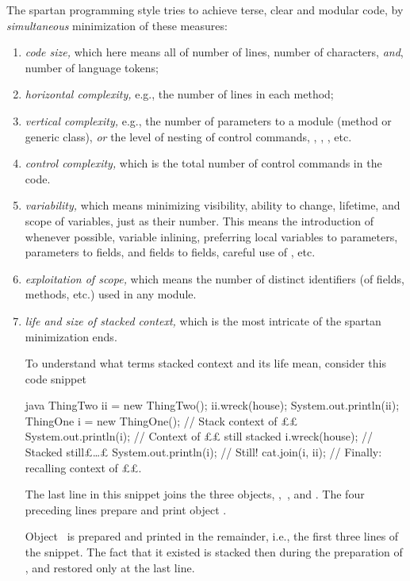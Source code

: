 The spartan programming style tries to achieve terse, clear and modular code,
by \textit{simultaneous} minimization of these measures:
\begin{enumerate}
  \item \textit{code size,} which here means all of number of lines, number of
        characters, \emph{and}, number of language tokens;
  \item \textit{horizontal complexity,} e.g., the number of lines in each
        method;
  \item \textit{vertical complexity,} e.g., the number of parameters to a
        module (method or generic class), \emph{or} the level of nesting of
        control commands, , , , etc.
  \item \textit{control complexity,} which is the total number of control
        commands in the code.
  \item \textit{variability,} which means minimizing visibility, ability to
        change, lifetime, and scope of variables, just as their number.
        This means the introduction of  whenever possible,
        variable inlining, preferring local variables to parameters, parameters
        to fields, and fields to  fields, careful use of
        , etc.
  \item \textit{exploitation of scope,} which means the number of distinct
        identifiers (of fields, methods, etc.) used in any module.
  \item \textit{life and size of stacked context,} which is the most intricate of the
        spartan minimization ends. 
        
        To understand what terms stacked context and its life mean, consider
        this code snippet

        \begin{code}[minipage,width=54ex]{java}
ThingTwo ii = new ThingTwo();
ii.wreck(house);
System.out.println(ii);
ThingOne i = new ThingOne(); // Stack context of ££
System.out.println(i);       // Context of ££ still stacked
i.wreck(house);              // Stacked still£…£
System.out.println(i);       // Still!
cat.join(i, ii);             // Finally: recalling context of ££.
  \end{code}
  The last line in this snippet joins the three objects,
  ,~, and . The four preceding lines prepare
  and print object .

  Object~ is prepared and printed in the remainder, i.e., the first three
  lines of the snippet.  The fact that it existed is stacked then during the
  preparation of , and restored only at the last line.


\end{enumerate}

